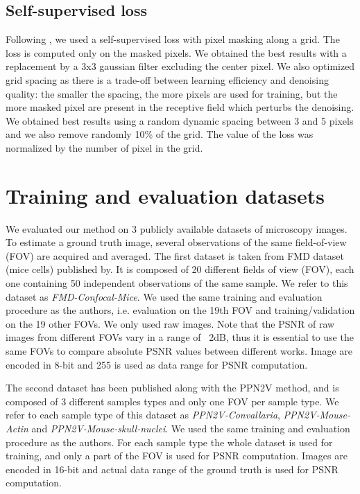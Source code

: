 \documentclass[review]{cvpr}
\begin{document}
\subsection{Self-supervised loss}
Following \cite{batson2019noise2self}, we used a self-supervised loss with pixel masking along a grid. The loss is computed only on the masked pixels.
We obtained the best results with a replacement by a 3x3 gaussian filter excluding the center pixel.
We also optimized grid spacing as there is a trade-off between learning efficiency and denoising quality: the smaller the spacing, the more pixels are used for training, but the more masked pixel are present in the receptive field which perturbs the denoising. We obtained best results using a random dynamic spacing between 3 and 5 pixels and we also remove randomly 10\% of the grid. The value of the loss was normalized by the number of pixel in the grid.


\section{Training and evaluation datasets}
We evaluated our method on 3 publicly available datasets of microscopy images. To estimate a ground truth image, several observations of the same field-of-view (FOV) are acquired and averaged.
The first dataset is taken from FMD dataset (mice cells) published by. It is composed of 20 different fields of view (FOV), each one containing 50 independent observations of the same sample. We refer to this dataset as \emph{FMD-Confocal-Mice}. We used the same training and evaluation procedure as the authors, i.e. evaluation on the 19th FOV and training/validation on the 19 other FOVs. We only used raw images. Note that the PSNR of raw images from different FOVs vary in a range of ~2dB, thus it is essential to use the same FOVs to compare absolute PSNR values between different works. Image are encoded in 8-bit and 255 is used as data range for PSNR computation.

The second dataset has been published along with the PPN2V method, and is composed of 3 different samples types and only one FOV per sample type. We refer to each sample type of this dataset as \emph{PPN2V-Convallaria}, \emph{PPN2V-Mouse-Actin} and \emph{PPN2V-Mouse-skull-nuclei}. We used the same training and evaluation procedure as the authors. For each sample type the whole dataset is used for training, and only a part of the FOV is used for PSNR computation. Images are encoded in 16-bit and actual data range of the ground truth is used for PSNR computation.
\end{document}
